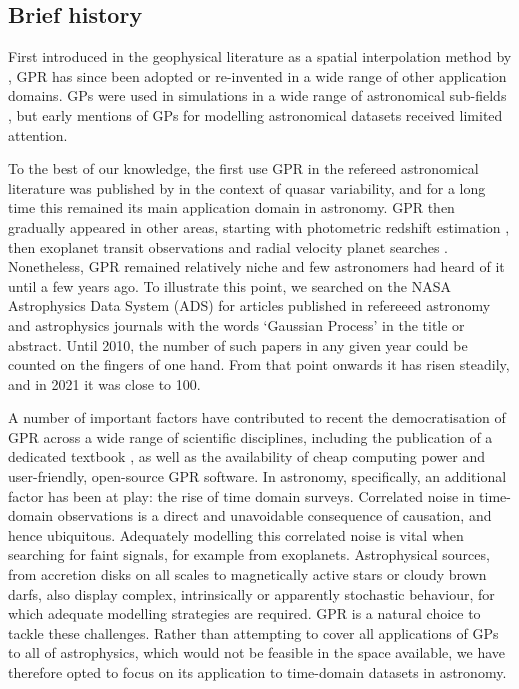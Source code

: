\documentclass[letterpaper]{ar-1col}
\begin{document}
\subsection{Brief history}

First introduced in the geophysical literature as a spatial interpolation method by \citet{kriging}, GPR has since been adopted or re-invented in a wide range of other application domains. GPs were used in simulations in a wide range of astronomical sub-fields \citep[see e.g.][]{1980asfr.symp..159B,1988JGR....9311569C,1997ApJ...483L...1P}, but early mentions of GPs for modelling astronomical datasets \citep[see e.g.][]{1976MitAG..38..192D,1978A&A....70..777V,1991MGeo...16..313J} received limited attention. 

To the best of our knowledge, the first use GPR in the refereed astronomical literature was published by \citet{prh92a} in the context of quasar variability, and for a long time this remained its main application domain in astronomy. GPR then gradually appeared in other areas, starting with photometric redshift estimation \citep{2006ApJ...647..102W}, then exoplanet transit observations \citep{2009ApJ...704...51C,2012MNRAS.419.2683G} and radial velocity planet searches \citep{2012MNRAS.419.3147A,2014MNRAS.443.2517H}. Nonetheless, GPR remained relatively niche and few astronomers had heard of it until a few years ago. To illustrate this point, we searched on the NASA Astrophysics Data System (ADS) for articles published in refereeed astronomy and astrophysics journals with the words `Gaussian Process' in the title or abstract. Until 2010, the number of such papers in any given year could be counted on the fingers of one hand. From that point onwards it has risen steadily, and in 2021 it was close to 100. 

A number of important factors have contributed to recent the democratisation of GPR across a wide range of scientific disciplines, including the publication of a dedicated textbook \citep{gpml}, as well as the availability of cheap computing power and user-friendly, open-source GPR software. In astronomy, specifically, an additional factor has been at play: the rise of time domain surveys. Correlated noise in time-domain observations is a direct and unavoidable consequence of causation, and hence ubiquitous. Adequately modelling this correlated noise is vital when searching for faint signals, for example from exoplanets. Astrophysical sources, from accretion disks on all scales to magnetically active stars or cloudy brown darfs, also display complex, intrinsically or apparently stochastic behaviour, for which adequate modelling strategies are required. GPR is a natural choice to tackle these challenges. Rather than attempting to cover all applications of GPs to all of astrophysics, which would not be feasible in the space available, we have therefore opted to focus on its application to time-domain datasets in astronomy.
\end{document}
